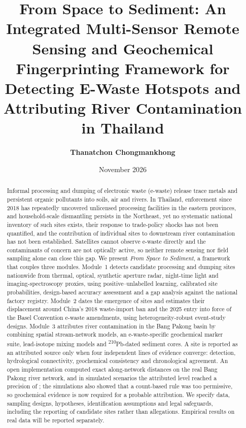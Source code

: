 \documentclass[10pt]{article}
\title{From Space to Sediment: An Integrated Multi-Sensor Remote Sensing and Geochemical Fingerprinting Framework for Detecting E-Waste Hotspots and Attributing River Contamination in Thailand}
\author{\textbf{Thanatchon Chongmankhong}}
\date{November 2026}
\begin{document}
\maketitle

\begin{abstract}
Informal processing and dumping of electronic waste (e-waste) release trace metals and persistent organic pollutants into soils, air and rivers. In Thailand, enforcement since 2018 has repeatedly uncovered unlicensed processing facilities in the eastern provinces, and household-scale dismantling persists in the Northeast, yet no systematic national inventory of such sites exists, their response to trade-policy shocks has not been quantified, and the contribution of individual sites to downstream river contamination has not been established. Satellites cannot observe e-waste directly and the contaminants of concern are not optically active, so neither remote sensing nor field sampling alone can close this gap. We present \emph{From Space to Sediment}, a framework that couples three modules. Module~1 detects candidate processing and dumping sites nationwide from thermal, optical, synthetic aperture radar, night-time light and imaging-spectroscopy proxies, using positive--unlabelled learning, calibrated site probabilities, design-based accuracy assessment and a gap analysis against the national factory registry. Module~2 dates the emergence of sites and estimates their displacement around China's 2018 waste-import ban and the 2025 entry into force of the Basel Convention e-waste amendments, using heterogeneity-robust event-study designs. Module~3 attributes river contamination in the Bang Pakong basin by combining spatial stream-network models, an e-waste-specific geochemical marker suite, lead-isotope mixing models and \textsuperscript{210}Pb-dated sediment cores. A site is reported as an attributed source only when four independent lines of evidence converge: detection, hydrological connectivity, geochemical consistency and chronological agreement. An open implementation computed exact along-network distances on the real Bang Pakong river network, and in \simRepsTotal{} simulated scenarios the attributed level reached a precision of \rngPrecAttributed; the simulations also showed that a count-based rule was too permissive, so geochemical evidence is now required for a probable attribution. We specify data, sampling designs, hypotheses, identification assumptions and legal safeguards, including the reporting of candidate sites rather than allegations. Empirical results on real data will be reported separately.
\end{abstract}
\end{document}
